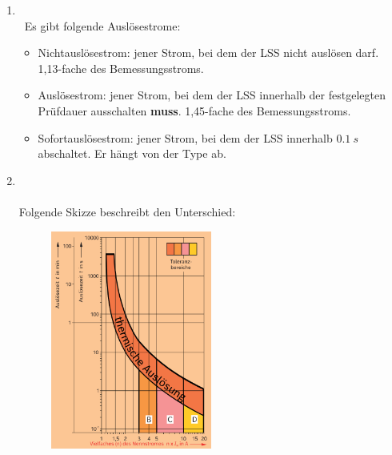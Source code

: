 \begin{enumerate}
    \clearpage

    \item   {} \\\
            Es gibt folgende Auslösestrome:

            \begin{itemize}
                \item Nichtauslösestrom: jener Strom, bei dem der LSS nicht auslösen darf. 1,13-fache des Bemessungsstroms.
                \item Auslösestrom: jener Strom, bei dem der LSS innerhalb der festgelegten Prüfdauer ausschalten \textbf{muss}. 1,45-fache des Bemessungsstroms.
                \item Sofortauslösestrom: jener Strom, bei dem der LSS innerhalb $\SI{0.1}{s}$ abschaltet. Er hängt von der Type ab.
            \end{itemize}

    \item   {} \\\\
            Folgende Skizze beschreibt den Unterschied:

            \begin{figure}[!htp]
                \centering
                \includegraphics[width = 0.5\textwidth]{img/Auslosecharakteristik.png}
            \end{figure}


\end{enumerate}
